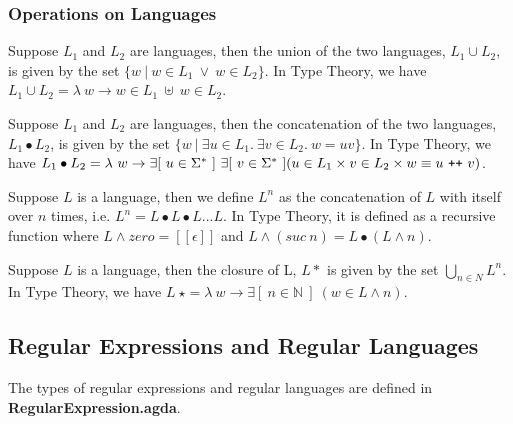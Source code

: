 \subsubsection{Operations on Languages}

\begin{defn} 
\label{defn:lang_union}
\noindent Suppose \(L_1\) and \(L_2\) are languages, then the union of
the two languages, \(L_1\cup L_2\), is given by the set \(\{w\
|\  w \in L_1\ \vee \ w \in L_2\}\). In Type Theory, we have \(L_1 \cup L_2 = \lambda\ w
\to w \in L_1\ \uplus\ w \in L_2\).
\end{defn}

\begin{defn}
\label{defn:lang_con}
\noindent Suppose \(L_1\) and \(L_2\) are languages, then
the concatenation of the two languages, \(L_1\bullet L_2\), is given
by the set \(\{w\  |\  \exists u\in L_1.\ \exists v\in L_2.\ w = uv\}\). In
Type Theory, we have \(L_1\bullet L_2 = \lambda\ w \to \exists[\
u \in \Sigma^*\ ]\ \exists[\ v \in \Sigma^*\ ] (u \in L_1 \times v \in
L_2 \times w \equiv u\ \texttt{+}\texttt{+}\  v )\).
\end{defn}

\begin{defn}
\label{defn:lang_power}
\noindent Suppose \(L\) is a language, then we define \(L^n\) as
the concatenation of \(L\) with itself over \(n\) times, i.e. \(L^n =
L\bullet L\bullet L ... L\). In Type Theory, it is defined as a recursive function where \(L \wedge zero = [\![\epsilon ]\!]\) and
\(L \wedge (suc\ n) = L \bullet (L \wedge n)\). 
\end{defn}

\begin{defn}
\label{defn:lang_star}
\noindent Suppose \(L\) is a language, then the closure of
L, \(L\ast\) is given by the set \(\bigcup_{n \in N} L^n\). In Type
Theory, we have \(L\ \star = \lambda\ w \to \exists [\ n \in \mathbb{N}\
]\ (w \in L \wedge n)\). 
\end{defn}


\subsection{Regular Expressions and Regular Languages}
\par The types of regular expressions and regular languages are defined in
\textbf{RegularExpression.agda}. 


